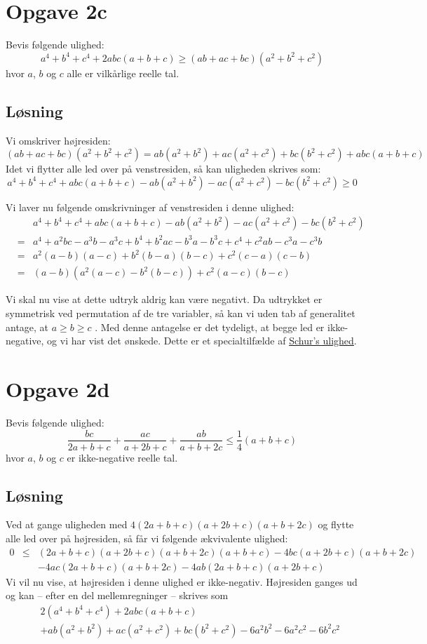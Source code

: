 \documentclass[12pt,oneside,a4paper]{article}
\newcommand{\bas}{\begin{eqnarray*}}
\newcommand{\eas}{\end{eqnarray*}}
\begin{document}
\section{Opgave 2c}
Bevis følgende ulighed:
$$
a^4+b^4+c^4+2abc(a+b+c) \ge (ab+ac+bc)(a^2+b^2+c^2)
$$
hvor $a$, $b$ og $c$ alle er vilkårlige reelle tal.

\subsection{Løsning}

Vi omskriver højresiden:
$$
(ab+ac+bc)(a^2+b^2+c^2) = ab(a^2+b^2) + ac(a^2+c^2) + bc(b^2+c^2) + abc(a+b+c)
$$
Idet vi flytter alle led over på venstresiden, så kan uligheden skrives som:
$$
a^4+b^4+c^4+abc(a+b+c) - ab(a^2+b^2) - ac(a^2+c^2) - bc(b^2+c^2) \ge 0
$$

Vi laver nu følgende omskrivninger af venstresiden i denne ulighed:
\bas
&& a^4+b^4+c^4+abc(a+b+c) - ab(a^2+b^2) - ac(a^2+c^2) - bc(b^2+c^2) \\
&=& a^4+a^2bc-a^3b-a^3c + b^4+b^2ac-b^3a-b^3c + c^4+c^2ab-c^3a-c^3b \\
&=& a^2(a-b)(a-c) + b^2(b-a)(b-c) + c^2(c-a)(c-b) \\
&=& (a-b)\left(a^2(a-c)-b^2(b-c)\right) + c^2(a-c)(b-c) 
\eas

Vi skal nu vise at dette udtryk aldrig kan være negativt.  Da udtrykket er
symmetrisk ved permutation af de tre variabler, så kan vi uden tab af
generalitet antage, at $a \ge b \ge c$ .  Med denne antagelse er det tydeligt,
at begge led er ikke-negative, og vi har vist det ønskede.
Dette er et specialtilfælde af \href{https://en.wikipedia.org/wiki/Schur\%27s\_inequality}{Schur's ulighed}.

\section{Opgave 2d}
Bevis følgende ulighed:
$$
\frac{bc}{2a+b+c} + \frac{ac}{a+2b+c} + \frac{ab}{a+b+2c} \le \frac 14 (a+b+c)
$$
hvor $a$, $b$ og $c$ er ikke-negative reelle tal.

\subsection{Løsning}
Ved at gange uligheden med $4(2a+b+c)(a+2b+c)(a+b+2c)$ og flytte alle led over på højresiden,
så får vi følgende ækvivalente ulighed:
\bas
0 &\le& (2a+b+c)(a+2b+c)(a+b+2c)(a+b+c) - 4bc(a+2b+c)(a+b+2c) \\
  && - 4ac(2a+b+c)(a+b+2c) - 4ab(2a+b+c)(a+2b+c) 
\eas
Vi vil nu vise, at højresiden i denne ulighed er ikke-negativ.  
Højresiden ganges ud og kan -- efter en del mellemregninger -- skrives som
\bas
&&2(a^4+b^4+c^4) + 2abc(a+b+c) \\
&&+ ab(a^2+b^2)+ac(a^2+c^2)+bc(b^2+c^2) - 6a^2b^2-6a^2c^2-6b^2c^2 
\eas
\end{document}
